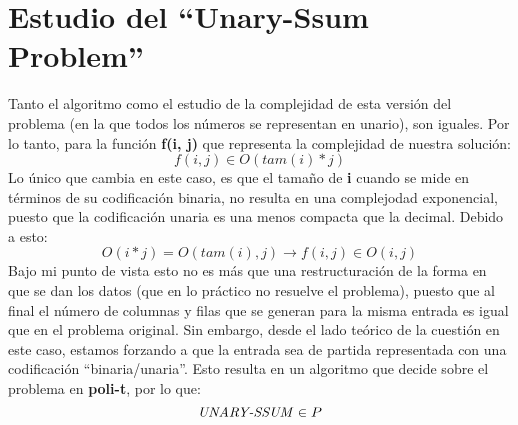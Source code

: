 \documentclass[../main]{subfiles}
\begin{document}
\section{Estudio del ``Unary-Ssum Problem''}
Tanto el algoritmo como el estudio de la complejidad de esta versión del problema (en la que todos los números se representan en unario), son iguales. Por lo tanto, para la función \textbf{f(i, j)} que representa la complejidad de nuestra solución:
\begin{equation*}
    f(i,j) \in O(tam(i)*j)
\end{equation*}
Lo único que cambia en este caso, es que el tamaño de \textbf{i} cuando se mide en términos de su codificación binaria, no resulta en una complejodad exponencial, puesto que la codificación unaria es una menos compacta que la decimal. Debido a esto:
\begin{equation*}
    O(i*j)=O(tam(i), j) \rightarrow f(i, j) \in O(i, j)
\end{equation*}
Bajo mi punto de vista esto no es más que una restructuración de la forma en que se dan los datos (que en lo práctico no resuelve el problema), puesto que al final el número de columnas y filas que se generan para la misma entrada es igual que en el problema original. Sin embargo, desde el lado teórico de la cuestión en este caso, estamos forzando a que la entrada sea de partida representada con una codificación ``binaria/unaria''. Esto resulta en un algoritmo que decide sobre el problema en \textbf{poli-t}, por lo que:
\begin{equation*}
    \text{\textit{UNARY-SSUM}} \in P
\end{equation*}
\end{document}
